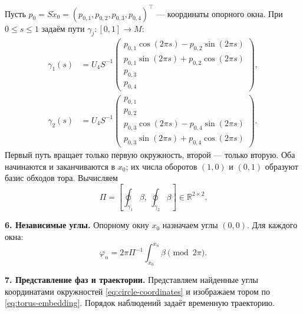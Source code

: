 \documentclass[11pt,a4paper]{article}
\begin{document}
Пусть \mbox{$p_0=S\widetilde x_0=(p_{0,1},p_{0,2},p_{0,3},p_{0,4})^\top$} ---
координаты опорного окна. При $0\le s\le1$ задаём пути
$\gamma_j:[0,1]\to M$:
$$
\begin{aligned}
\gamma_1(s)&=U_4S^{-1}
\begin{pmatrix}
p_{0,1}\cos(2\pi s)-p_{0,2}\sin(2\pi s)\\
p_{0,1}\sin(2\pi s)+p_{0,2}\cos(2\pi s)\\
p_{0,3}\\p_{0,4}
\end{pmatrix},\\[4pt]
\gamma_2(s)&=U_4S^{-1}
\begin{pmatrix}
p_{0,1}\\p_{0,2}\\
p_{0,3}\cos(2\pi s)-p_{0,4}\sin(2\pi s)\\
p_{0,3}\sin(2\pi s)+p_{0,4}\cos(2\pi s)
\end{pmatrix}.
\end{aligned}
$$
Первый путь вращает только первую окружность, второй --- только вторую.
Оба начинаются и заканчиваются в $x_0$; их числа оборотов $(1,0)$ и $(0,1)$
образуют базис обходов тора. Вычисляем
$$
\Pi=\left[\oint_{\gamma_1}\beta,\ \oint_{\gamma_2}\beta\right]
\in\mathbb R^{2\times2}.
$$

\textbf{6. Независимые углы.}
Опорному окну $x_0$ назначаем углы $(0,0)$. Для каждого окна:
$$
\varphi_n=2\pi\Pi^{-1}\int_{x_0}^{x_n}\beta\pmod{2\pi}.
$$

\textbf{7. Представление фаз и траектории.}
Представляем найденные углы координатами окружностей
\eqref{eq:circle-coordinates} и изображаем тором по \eqref{eq:torus-embedding}.
Порядок наблюдений задаёт временную траекторию.
\end{document}
